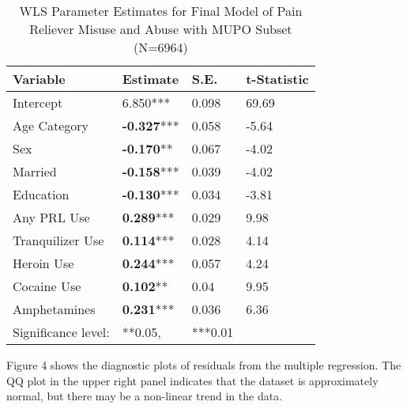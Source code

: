 \documentclass[sigconf]{acmart}
\begin{document}
\begin{table}
  \caption{WLS Parameter Estimates for Final Model of Pain Reliever Misuse and Abuse 
  with MUPO Subset (N=6964)}
  \label{tab:freq}
  \begin{tabular}{llll}
    \toprule
    Variable & Estimate& S.E.& t-Statistic \\
    \midrule
    Intercept& 6.850***& 0.098& 69.69 \\
    Age Category& \textbf{-0.327}***& 0.058& -5.64 \\
    Sex& \textbf{-0.170}**& 0.067& -4.02 \\
    Married& \textbf{-0.158}***& 0.039& -4.02 \\
    Education& \textbf{-0.130}***& 0.034& -3.81 \\
    Any PRL Use& \textbf{0.289}***& 0.029& 9.98 \\
    Tranquilizer Use& \textbf{0.114}***& 0.028& 4.14 \\
    Heroin Use& \textbf{0.244}***& 0.057& 4.24 \\
    Cocaine Use& \textbf{0.102}**& 0.04& 9.95 \\
    Amphetamines& \textbf{0.231}***& 0.036& 6.36 \\
    \bottomrule
    Significance level:& **0.05,& ***0.01&
  \end{tabular}
\end{table}




Figure 4 shows the diagnostic plots of residuals from 
the multiple regression. The QQ plot in the upper right panel indicates that 
the dataset is approximately normal, but there may be a non-linear trend 
in the data. 




\end{document}
